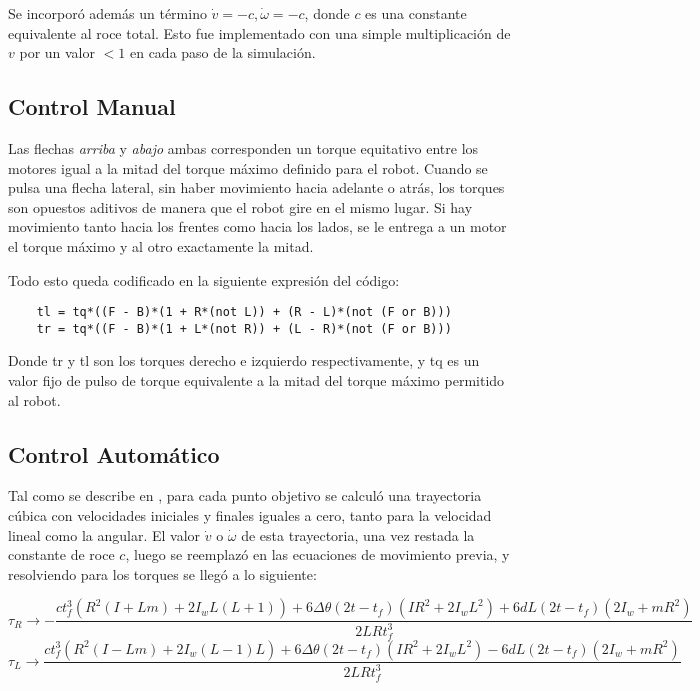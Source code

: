 \documentclass[11pt,letterpaper,twoside]{report}%
\begin{document}
Se incorpor\'o adem\'as un t\'ermino $\dot{v} = -c, \dot{\omega} = -c$, donde $c$ es una constante equivalente al roce total. Esto fue implementado con una simple multiplicaci\'on de $v$ por un valor $<1$ en cada paso de la simulaci\'on. 

\subsection{Control Manual}
Las flechas \textit{arriba} y \textit{abajo} ambas corresponden un torque equitativo entre los motores igual a la mitad del torque m\'aximo definido para el robot. Cuando se pulsa una flecha lateral, sin haber movimiento hacia adelante o atr\'as, los torques son opuestos aditivos de manera que el robot gire en el mismo lugar. Si hay movimiento tanto hacia los frentes como hacia los lados, se le entrega a un motor el torque m\'aximo y al otro exactamente la mitad.

Todo esto queda codificado en la siguiente expresi\'on del c\'odigo:
\begin{lstlisting}
	tl = tq*((F - B)*(1 + R*(not L)) + (R - L)*(not (F or B)))
	tr = tq*((F - B)*(1 + L*(not R)) + (L - R)*(not (F or B)))
\end{lstlisting}

Donde tr y tl son los torques derecho e izquierdo respectivamente, y tq es un valor fijo de pulso de torque equivalente a la mitad del torque m\'aximo permitido al robot.

\subsection{Control Autom\'atico}
Tal como se describe en \cite[pg. 188]{book1}, para cada punto objetivo se calcul\'o una trayectoria c\'ubica con velocidades iniciales y finales iguales a cero, tanto para la velocidad lineal como la angular. El valor $\dot{v}$ o $\dot{\omega}$ de esta trayectoria, una vez restada la constante de roce $c$, luego se reemplaz\'o en las ecuaciones de movimiento previa, y resolviendo para los torques se lleg\'o a lo siguiente:

\begin{equation*}
	\tau_R \to -\frac{c t_f^3 \left(R^2 (I+L m)+2 I_w L (L+1)\right)+6 \Delta\theta (2
		t-t_f) \left(I R^2+2 I_w L^2\right)+6 d L (2 t-t_f) \left(2 I_w+m
		R^2\right)}{2 L R t_f^3}
\end{equation*}
\begin{equation*}
	\tau_L \to \frac{c t_f^3 \left(R^2 (I-L m)+2 I_w (L-1)
		L\right)+6 \Delta\theta (2 t-t_f) \left(I R^2+2 I_w L^2\right)-6 d L (2
		t-t_f) \left(2 I_w+m R^2\right)}{2 L R t_f^3}
\end{equation*}
\end{document}
